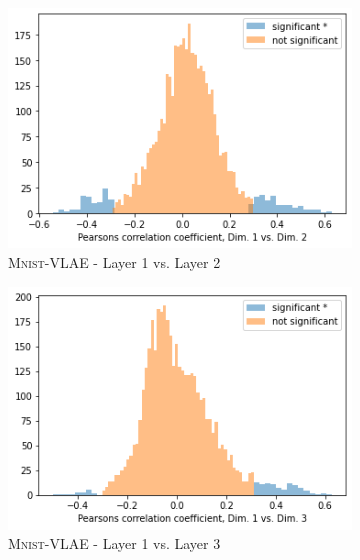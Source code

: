 \begin{figure}
    \centering
    \begin{subfigure}{.3\textwidth}
        \includegraphics[width=\textwidth]{images/notprop/dsprites/vlae/dim_1_2.png}
        \caption{\textsc{Mnist}-VLAE - Layer 1 vs. Layer 2}
    \end{subfigure}
    \hfill
    \begin{subfigure}{.3\textwidth}
        \includegraphics[width=\textwidth]{images/notprop/dsprites/vlae/dim_1_3.png}
        \caption{\textsc{Mnist}-VLAE - Layer 1 vs. Layer 3}
    \end{subfigure}
    \hfill
    \begin{subfigure}{.3\textwidth}

\end{subfigure}
\end{figure}
